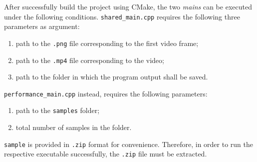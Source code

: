 \noindent
After successfully build the project using CMake, the two \textit{mains} can be executed under the following conditions.
\verb|shared_main.cpp| requires the following three parameters as argument:
\begin{enumerate}
    \item path to the \verb|.png| file corresponding to the first video frame;
    \item path to the \verb|.mp4| file corresponding to the video;
    \item path to the folder in which the program output shall be saved.
\end{enumerate}

\noindent
\verb|performance_main.cpp| instead, requires the following parameters:
\begin{enumerate}
    \item path to the \verb|samples| folder;
    \item total number of samples in the folder.
\end{enumerate}
\verb|sample| is provided in \verb|.zip| format for convenience. Therefore, in order to run the respective executable
successfully, the \verb|.zip| file must be extracted.
